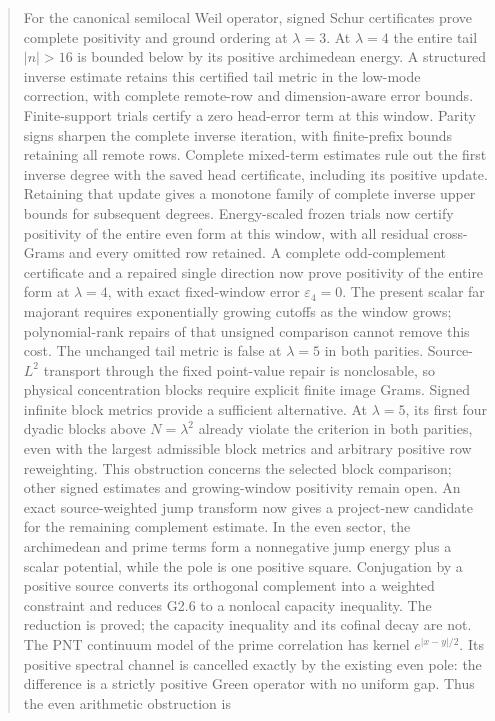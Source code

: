\documentclass[11pt]{article}
\theoremstyle{remark}
\begin{document}
\begin{abstract}
For the canonical semilocal Weil operator, signed Schur certificates
prove complete positivity and ground ordering at $\lambda=3$.
At $\lambda=4$ the entire tail $|n|>16$ is bounded below by its
positive archimedean energy. A structured inverse estimate retains
this certified tail metric in the low-mode correction, with complete
remote-row and dimension-aware error bounds. Finite-support trials
certify a zero head-error term at this window. Parity signs sharpen the complete inverse
iteration, with finite-prefix bounds retaining all remote rows.
Complete mixed-term estimates rule out the first inverse degree
with the saved head certificate, including its positive update.
Retaining that update gives a monotone family of complete inverse
upper bounds for subsequent degrees. Energy-scaled frozen trials now certify positivity of the entire even
form at this window, with all residual cross-Grams and every omitted
row retained. A complete odd-complement certificate and a repaired
single direction now prove positivity of the entire form at
$\lambda=4$, with exact fixed-window error $\varepsilon_4=0$. The present scalar far
majorant requires exponentially growing cutoffs as the window grows;
polynomial-rank repairs of that unsigned comparison cannot remove
this cost. The unchanged tail metric is false at $\lambda=5$ in both
parities. Source-$L^2$ transport through the fixed point-value repair
is nonclosable, so physical concentration blocks require explicit
finite image Grams. Signed infinite block metrics provide a sufficient
alternative. At $\lambda=5$, its first four dyadic blocks above
$N=\lambda^2$ already violate the criterion in both parities, even
with the largest admissible block metrics and arbitrary positive row
reweighting. This obstruction concerns the selected block comparison;
other signed estimates and growing-window positivity remain open.
An exact source-weighted jump transform now gives a project-new
candidate for the remaining complement estimate.  In the even sector,
the archimedean and prime terms form a nonnegative jump energy plus a
scalar potential, while the pole is one positive square.  Conjugation
by a positive source converts its orthogonal complement into a
weighted constraint and reduces G2.6 to a nonlocal
capacity inequality.  The reduction is proved; the capacity inequality
and its cofinal decay are not.
The PNT continuum model of the prime correlation has kernel
$e^{|x-y|/2}$. Its positive spectral channel is cancelled exactly by
the existing even pole: the difference is a strictly positive Green
operator with no uniform gap. Thus the even arithmetic obstruction is

\end{abstract}
\end{document}
